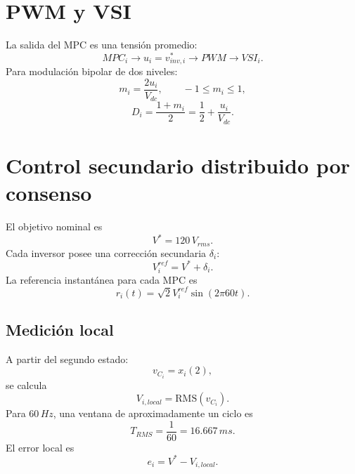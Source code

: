 \documentclass[12pt,a4paper]{article}
\begin{document}
\section{PWM y VSI}
La salida del MPC es una tensión promedio:
\begin{equation}
MPC_i\rightarrow u_i=v_{inv,i}^{*}\rightarrow PWM\rightarrow VSI_i.
\end{equation}
Para modulación bipolar de dos niveles:
\begin{equation}
m_i=\frac{2u_i}{V_{dc}},\qquad -1\leq m_i\leq1,
\end{equation}
\begin{equation}
D_i=\frac{1+m_i}{2}=\frac{1}{2}+\frac{u_i}{V_{dc}}.
\end{equation}

\section{Control secundario distribuido por consenso}
El objetivo nominal es
\begin{equation}
V^{*}=120\,V_{rms}.
\end{equation}
Cada inversor posee una corrección secundaria $\delta_i$:
\begin{equation}
\boxed{V_i^{ref}=V^{*}+\delta_i}.
\end{equation}
La referencia instantánea para cada MPC es
\begin{equation}
\boxed{r_i(t)=\sqrt{2}V_i^{ref}\sin(2\pi60t)}.
\end{equation}

\subsection{Medición local}
A partir del segundo estado:
\begin{equation}
v_{C_i}=x_i(2),
\end{equation}
se calcula
\begin{equation}
\boxed{V_{i,local}=\mathrm{RMS}(v_{C_i})}.
\end{equation}
Para $60\,Hz$, una ventana de aproximadamente un ciclo es
\begin{equation}
T_{RMS}=\frac{1}{60}=16.667\,ms.
\end{equation}
El error local es
\begin{equation}
e_i=V^{*}-V_{i,local}.
\end{equation}
\end{document}
